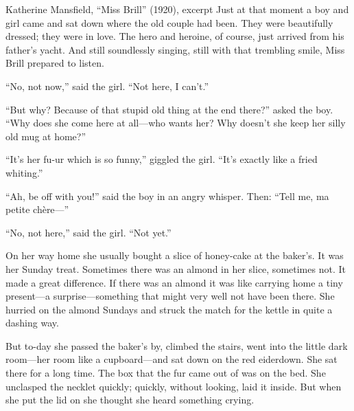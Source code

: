 \documentclass[11pt]{article}
\begin{document}
\begin{passage}{Katherine Mansfield, ``Miss Brill'' (1920), excerpt}{}
\pp Just at that moment a boy and girl came and sat down where the old couple had been. They were beautifully dressed; they were in love. The hero and heroine, of course, just arrived from his father's yacht. And still soundlessly singing, still with that trembling smile, Miss Brill prepared to listen.

\pp ``No, not now,'' said the girl. ``Not here, I can't.''

\pp ``But why? Because of that stupid old thing at the end there?'' asked the boy. ``Why does she come here at all---who wants her? Why doesn't she keep her silly old mug at home?''

\pp ``It's her fu-ur which is so funny,'' giggled the girl. ``It's exactly like a fried whiting.''

\pp ``Ah, be off with you!'' said the boy in an angry whisper. Then: ``Tell me, ma petite ch\`ere---''

\pp ``No, not here,'' said the girl. ``Not yet.''

\pp On her way home she usually bought a slice of honey-cake at the baker's. It was her Sunday treat. Sometimes there was an almond in her slice, sometimes not. It made a great difference. If there was an almond it was like carrying home a tiny present---a surprise---something that might very well not have been there. She hurried on the almond Sundays and struck the match for the kettle in quite a dashing way.

\pp But to-day she passed the baker's by, climbed the stairs, went into the little dark room---her room like a cupboard---and sat down on the red eiderdown. She sat there for a long time. The box that the fur came out of was on the bed. She unclasped the necklet quickly; quickly, without looking, laid it inside. But when she put the lid on she thought she heard something crying.
\end{passage}

\makekey
\end{document}
